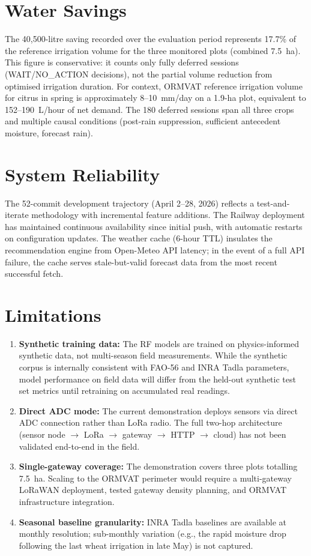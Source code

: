 \documentclass[12pt,a4paper]{report}
\begin{document}
\section{Water Savings}

The 40,500-litre saving recorded over the evaluation period represents 17.7\% of the reference irrigation volume for the three monitored plots (combined 7.5~ha). This figure is conservative: it counts only fully deferred sessions (WAIT/NO\_ACTION decisions), not the partial volume reduction from optimised irrigation duration. For context, ORMVAT reference irrigation volume for citrus in spring is approximately 8--10~mm/day on a 1.9-ha plot, equivalent to 152--190~L/hour of net demand. The 180 deferred sessions span all three crops and multiple causal conditions (post-rain suppression, sufficient antecedent moisture, forecast rain).

\section{System Reliability}

The 52-commit development trajectory (April 2--28, 2026) reflects a test-and-iterate methodology with incremental feature additions. The Railway deployment has maintained continuous availability since initial push, with automatic restarts on configuration updates. The weather cache (6-hour TTL) insulates the recommendation engine from Open-Meteo API latency; in the event of a full API failure, the cache serves stale-but-valid forecast data from the most recent successful fetch.

\section{Limitations}

\begin{enumerate}
  \item \textbf{Synthetic training data:} The RF models are trained on physics-informed synthetic data, not multi-season field measurements. While the synthetic corpus is internally consistent with FAO-56 and INRA Tadla parameters, model performance on field data will differ from the held-out synthetic test set metrics until retraining on accumulated real readings.
  \item \textbf{Direct ADC mode:} The current demonstration deploys sensors via direct ADC connection rather than LoRa radio. The full two-hop architecture (sensor node \ensuremath{\rightarrow} LoRa \ensuremath{\rightarrow} gateway \ensuremath{\rightarrow} HTTP \ensuremath{\rightarrow} cloud) has not been validated end-to-end in the field.
  \item \textbf{Single-gateway coverage:} The demonstration covers three plots totalling 7.5~ha. Scaling to the ORMVAT perimeter would require a multi-gateway LoRaWAN deployment, tested gateway density planning, and ORMVAT infrastructure integration.
  \item \textbf{Seasonal baseline granularity:} INRA Tadla baselines are available at monthly resolution; sub-monthly variation (e.g., the rapid moisture drop following the last wheat irrigation in late May) is not captured.
\end{enumerate}
\end{document}
